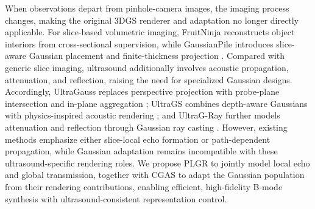 

When observations depart from pinhole-camera images, the imaging process
changes, making the original 3DGS renderer and adaptation no longer directly
applicable.
For slice-based volumetric imaging, FruitNinja reconstructs object interiors
from cross-sectional supervision, while GaussianPile introduces slice-aware
Gaussian placement and finite-thickness projection
\cite{wuFruitNinja3DObject2025,kongGaussianPileUnifiedSparse2026}.
Compared with generic slice imaging, ultrasound additionally involves acoustic
propagation, attenuation, and reflection, raising the need for specialized
Gaussian designs.
Accordingly, UltraGauss replaces perspective projection with probe-plane
intersection and in-plane aggregation
\cite{eidUltraGaussUltrafastGaussian2025}; UltraGS combines depth-aware
Gaussians with physics-inspired acoustic rendering
\cite{yangUltraGSRealTimePhysicallyDecoupled2025}; and UltraG-Ray further models
attenuation and reflection through Gaussian ray casting
\cite{duelmerUltraGRayPhysicsBasedGaussian2026}.
However, existing methods emphasize either slice-local echo formation
or path-dependent propagation, while Gaussian adaptation remains incompatible
with these ultrasound-specific rendering roles.
We propose PLGR to jointly model local echo and global transmission,
together with CGAS to adapt the Gaussian population from their rendering
contributions, enabling efficient, high-fidelity B-mode synthesis with
ultrasound-consistent representation control.
